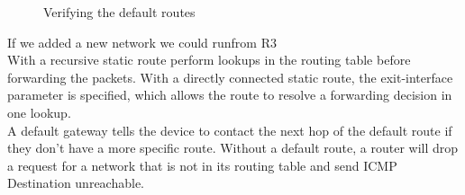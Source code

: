 \documentclass[../EngineeringJournal_CDavis.tex]{subfiles}
\begin{document}
\begin{figure}[!hbt]\centering
{}\hfill
{}\par 
\caption{Verifying the default routes}
\label{verify6}
\end{figure}

\clearpage


If we added a new network we could run\linebreak[1]
from R3
\\With a recursive static route perform lookups in the routing table before forwarding
the packets. With a directly connected static route, the exit-interface  parameter is
specified, which allows the route to resolve a forwarding decision in one lookup.
\\A default gateway tells the device to contact the next hop of the default route if
they don't have a more specific route. Without a default route, a router will drop a
request for a network that is not in its routing table and send ICMP Destination
unreachable.



\end{document}
